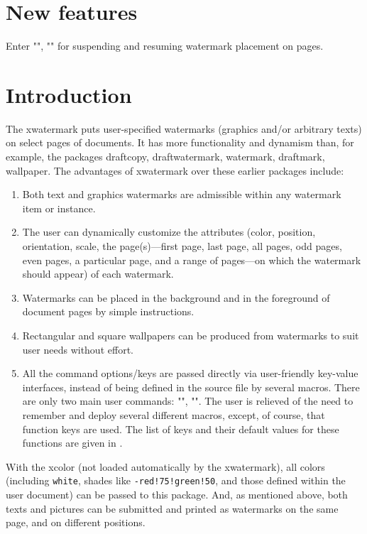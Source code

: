 \documentclass[a4paper]{ltxdoc}
\newcommand{\pkg}[1]{\textsf{#1}}
\newcommand{\hx}[1]{\texttt{#1}}
\begin{document}
\tableofcontents

\section{New features} \label{sec-newfeatures}

Enter "\xwmwatermarkon", "\xwmwatermarkoff" for suspending and resuming watermark placement on pages.



\section{Introduction} \label{sec-intro}

The \pkg{xwatermark} puts user-specified watermarks (graphics and/or arbitrary texts) on select pages of documents. It has more functionality and dynamism than, for example, the packages \pkg{draftcopy}, \pkg{draftwatermark}, \pkg{watermark}, \pkg{draftmark}, \pkg{wallpaper}. The advantages of \pkg{xwatermark} over these earlier packages include:

\begin{enumerate}
\item Both text and graphics watermarks are admissible within any watermark item or instance.
\item The user can dynamically customize the attributes (color, position, orientation, scale, the page(s)---first page, last page, all pages, odd pages, even pages, a particular page, and a range of pages---on which the watermark should appear) of each watermark.
\item Watermarks can be placed in the background and in the foreground of document pages by simple instructions.
\item Rectangular and square wallpapers can be produced from watermarks to suit user needs without effort.
\item All the command options/keys are passed directly via user-friendly key-value interfaces, instead of being defined in the source file by several macros. There are only two main user commands: "\newwatermark", "\newwallpaper". The user is relieved of the need to remember and deploy several different macros, except, of course, that function keys are used. The list of keys and their default values for these functions are given in .
\end{enumerate}

With the \pkg{xcolor} (not loaded automatically by the \pkg{xwatermark}), all colors (including \hx{white}, shades like \hx{-red!75!green!50}, and those defined within the user document) can be passed to this package. And, as mentioned above, both texts and pictures can be submitted and printed as watermarks on the same page, and on different positions.
\end{document}
